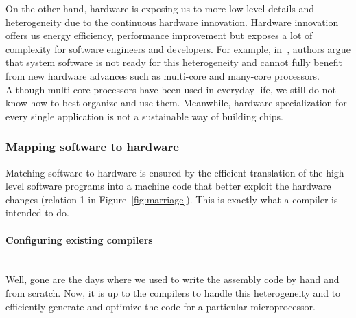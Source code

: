 On the other hand, hardware is exposing us to more low level details and heterogeneity due to the continuous hardware innovation. 
Hardware innovation offers us energy efficiency, performance improvement but exposes a lot of complexity for software engineers and developers.
For example, in~\cite{he2010computer}, authors argue that system software is not ready for this heterogeneity and cannot fully benefit from new hardware advances such as multi-core and many-core processors. Although multi-core processors have been used in everyday life, we still do not know how to best organize and use them. 
Meanwhile, hardware specialization for every single application is not a sustainable way of building chips.

\subsubsection{Mapping software to hardware}
\label{Mapping software to hardware}
Matching software to hardware is ensured by the efficient translation of the high-level software programs into a machine code that better exploit the hardware changes (relation 1 in Figure~\ref{fig:marriage}). This is exactly what a compiler is intended to do.

\paragraph{Configuring existing compilers}~\\ 
Well, gone are the days where we used to write the assembly code by hand and from scratch. Now, it is up to the compilers to handle this heterogeneity and to efficiently generate and optimize the code for a particular microprocessor. 

